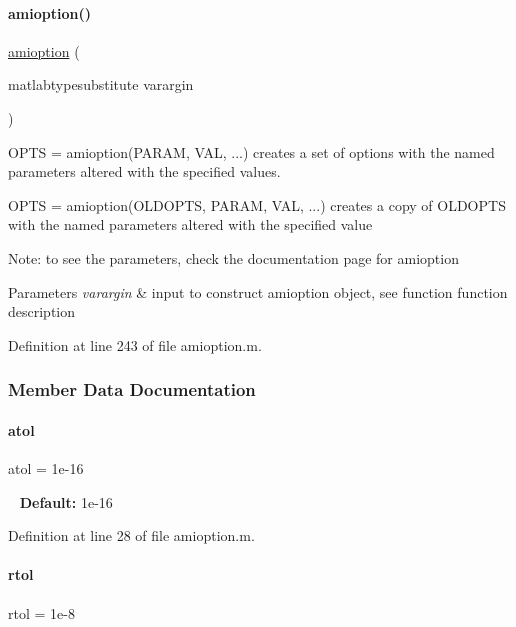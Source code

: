 \paragraph{\texorpdfstring{amioption()}{amioption()}}
{\footnotesize\ttfamily \mbox{\hyperlink{classamioption}{amioption}} (\begin{DoxyParamCaption}\item[{matlabtypesubstitute}]{varargin }\end{DoxyParamCaption})}

O\+P\+TS = amioption(P\+A\+R\+AM, V\+AL, ...) creates a set of options with the named parameters altered with the specified values.

O\+P\+TS = amioption(O\+L\+D\+O\+P\+TS, P\+A\+R\+AM, V\+AL, ...) creates a copy of O\+L\+D\+O\+P\+TS with the named parameters altered with the specified value

Note\+: to see the parameters, check the documentation page for amioption


\begin{DoxyParams}{Parameters}
{\em varargin} & input to construct amioption object, see function function description \\
\hline
\end{DoxyParams}


Definition at line 243 of file amioption.\+m.



\subsubsection{Member Data Documentation}
\mbox{\label{classamioption_a0c5f3dcf809a17b895fe12fc91272349}} 
\paragraph{\texorpdfstring{atol}{atol}}
{\footnotesize\ttfamily atol = 1e-\/16}

~\newline
{\bfseries Default\+:} 1e-\/16 

Definition at line 28 of file amioption.\+m.

\mbox{\label{classamioption_a7978e9a4674f869e6b2950e2f6262ca5}} 
\paragraph{\texorpdfstring{rtol}{rtol}}
{\footnotesize\ttfamily rtol = 1e-\/8}

